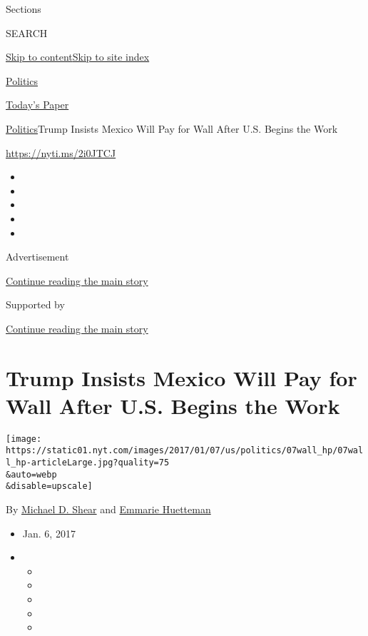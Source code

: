 Sections

SEARCH

\protect\hyperlink{site-content}{Skip to
content}\protect\hyperlink{site-index}{Skip to site index}

\href{https://www.nytimes.com/section/politics}{Politics}

\href{https://myaccount.nytimes.com/auth/login?response_type=cookie\&client_id=vi}{}

\href{https://www.nytimes.com/section/todayspaper}{Today's Paper}

\href{/section/politics}{Politics}\textbar{}Trump Insists Mexico Will
Pay for Wall After U.S. Begins the Work

\url{https://nyti.ms/2i0JTCJ}

\begin{itemize}
\item
\item
\item
\item
\item
\end{itemize}

Advertisement

\protect\hyperlink{after-top}{Continue reading the main story}

Supported by

\protect\hyperlink{after-sponsor}{Continue reading the main story}

\hypertarget{trump-insists-mexico-will-pay-for-wall-after-us-begins-the-work}{%
\section{Trump Insists Mexico Will Pay for Wall After U.S. Begins the
Work}\label{trump-insists-mexico-will-pay-for-wall-after-us-begins-the-work}}

\texttt{[image: https://static01.nyt.com/images/2017/01/07/us/politics/07wall\_hp/07wall\_hp-articleLarge.jpg?quality=75\\\&auto=webp\\\&disable=upscale]}

By \href{http://www.nytimes.com/by/michael-d-shear}{Michael D. Shear}
and \href{https://www.nytimes.com/by/emmarie-huetteman}{Emmarie
Huetteman}

\begin{itemize}
\item
  Jan. 6, 2017
\item
  \begin{itemize}
  \item
  \item
  \item
  \item
  \item
  \end{itemize}
\end{itemize}

